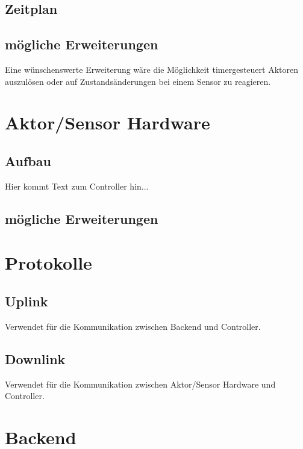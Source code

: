 \documentclass[12pt,a4paper]{article}
\begin{document}
\subsection{Zeitplan}





\subsection{mögliche Erweiterungen}
Eine wünschenswerte Erweiterung wäre die Möglichkeit timergesteuert Aktoren auszulösen oder auf Zustandsänderungen bei einem Sensor zu reagieren.





\section{Aktor/Sensor Hardware}

\subsection{Aufbau}


Hier kommt Text zum Controller hin...

\subsection{mögliche Erweiterungen}


\section{Protokolle}

\subsection{Uplink}

Verwendet für die Kommunikation zwischen Backend und Controller.

\subsection{Downlink}

Verwendet für die Kommunikation zwischen Aktor/Sensor Hardware und Controller.

\section{Backend}
\end{document}
